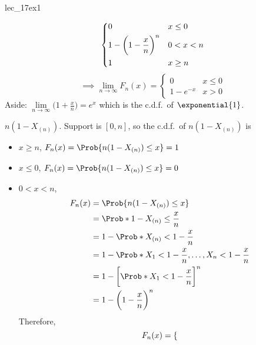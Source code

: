 \begin{Example}{}{lec_17ex1}
\begin{enumerate}[label=(\roman*)]
\begin{itemize}
\[\begin{dcases}
                                0                                & x\le 0 \\
                                1-\biggl(1-\frac{x}{n} \biggr)^n & 0<x<n  \\
                                1                                & x\ge n
                            \end{dcases} \]
                        \[ \implies
                            \lim\limits_{{n} \to {\infty}} F_n(x)=
                            \begin{cases}
                                0        & x\le 0 \\
                                1-e^{-x} & x>0
                            \end{cases} \]
                        Aside: $
                            \displaystyle  \lim\limits_{{n} \to {\infty}}\biggl(1+\frac{x}{n}\biggr)=
                            e^x $
                        which is the c.d.f.\ of $ \exponential{1} $.
              \end{itemize}
              $ n(1-X_{(n)}) $. Support is $ [0,n] $, so the c.d.f.\ of
              $ n(1-X_{(n)}) $ is
              \begin{itemize}
                  \item $ x\ge n $, $ F_n(x)=
                            \Prob{n(1-X_{(n)})\le x}=1 $
                  \item $ x\le 0 $, $ F_n(x)=
                            \Prob{n(1-X_{(n)})\le x}=0 $
                  \item $ 0<x<n $,
                        \begin{align*}
                            F_n(x)
                             & = \Prob{n(1-X_{(n)})\le x}                   \\
                             & =\Prob*{1-X_{(n)}\le \frac{x}{n}}            \\
                             & =1-\Prob*{X_{(n)}<1-\frac{x}{n}}             \\
                             & =1-\Prob*{X_1<1-\frac{x}{n},\ldots,
                            X_n<1-\frac{x}{n}}                              \\
                             & =1-\biggl[\Prob*{X_1<1-\frac{x}{n}}\biggr]^n \\
                             & =1-\biggl(1-\frac{x}{n}\biggr)^n
                        \end{align*}
                        Therefore,
                        \[ F_n(x)=\begin{dcases}

\end{dcases}\]
\end{itemize}
\end{enumerate}
\end{Example}
